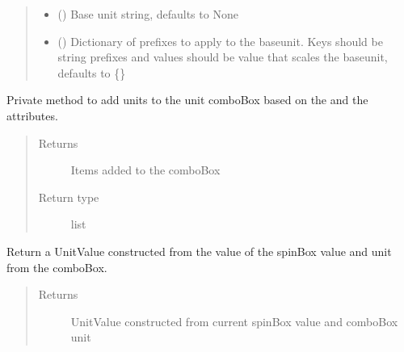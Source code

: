 \documentclass[letterpaper,10pt,english]{sphinxmanual}
\begin{document}
\begin{fulllineitems}
\begin{quote}
\begin{description}
\begin{itemize}
\item {} 
 (\sphinxstyleliteralemphasis{\sphinxupquote{, }}) \textendash{} Base unit string, defaults to None

\item {} 
 (\sphinxstyleliteralemphasis{\sphinxupquote{, }}) \textendash{} Dictionary of prefixes to apply to the baseunit.
Keys should be string prefixes and values should
be value that scales the baseunit, defaults to \{\}

\end{itemize}

\end{description}\end{quote}

\begin{fulllineitems}
\label{\detokenize{polo.widgets:polo.widgets.unit_combo.UnitComboBox._set_unit_combobox_text}}
Private method to add units to the unit comboBox based
on the  and the  attributes.
\begin{quote}\begin{description}
\item[{Returns}] \leavevmode
Items added to the comboBox

\item[{Return type}] \leavevmode
list

\end{description}\end{quote}

\end{fulllineitems}


\begin{fulllineitems}
\label{\detokenize{polo.widgets:polo.widgets.unit_combo.UnitComboBox.get_value}}
Return a UnitValue constructed from the value of the
spinBox value and unit from the comboBox.
\begin{quote}\begin{description}
\item[{Returns}] \leavevmode
UnitValue constructed from current spinBox 
value and comboBox unit


\end{description}
\end{quote}
\end{fulllineitems}
\end{fulllineitems}
\end{document}
